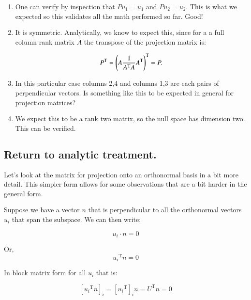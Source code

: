 \documentclass{article}      %
\newcommand{\transpose}[1]{{{#1}^{\text{T}}}}
\begin{document}
\begin{enumerate}
\item
One can verify by inspection that $P u_1 = u_1$ and $P u_2 = u_2$.  This is what we expected
so this validates all the math performed so far.  Good!


\item
It is symmetric.  Analytically, we know to expect this, since for a 
a full column rank matrix $A$ the transpose of the projection matrix is:

\[
\transpose{P} = \transpose{\left(A \inv{\transpose{A}A} \transpose{A}\right)} = P.
\]

\item
In this particular case columns 2,4 and columns 1,3 are each pairs of
perpendicular vectors.  Is something like this to be expected in general for
projection matrices?

\item
We expect this to be a rank two matrix, so the null space has dimension two.  This can be verified.

\end{enumerate}

\subsection{ Return to analytic treatment. }

Let's look at the matrix for projection onto an orthonormal basis in a bit more detail.  This simpler form allows for
some observations that are a bit harder in the general form.

Suppose we have a vector $n$ that is perpendicular to all the orthonormal vectors $u_i$ that span the subspace.  We can then write:

\[
u_i \cdot n = 0
\]

Or,
\[
\transpose{u_i} n = 0
\]

In block matrix form for all $u_i$ that is:

\[
[\transpose{u_i} n]_i = [\transpose{u_i}]_i n = \transpose{U} n = 0
\]
\end{document}
